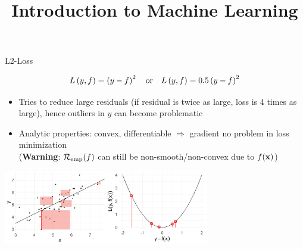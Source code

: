 \documentclass[11pt,compress,t,notes=noshow, xcolor=table]{beamer}
\title{Introduction to Machine Learning}
\begin{document}
    

\begin{vbframe}{L2-Loss}

\vspace*{-0.5cm}

$$
L\left(y, f\right) = \left(y-f\right)^2 \quad \text{or} \quad L\left(y, f\right) = 0.5 \left(y-f\right)^2
$$

\vspace*{-2mm}

\begin{itemize}
\item Tries to reduce large residuals (if residual is twice as large, loss is 4 times as large), hence outliers in $y$ can become problematic
\item Analytic properties: convex, differentiable $\Rightarrow$ gradient no problem in loss minimization\\ {\small (\textbf{Warning}: $\mathcal{R}_{\text{emp}}(f)$ can still be non-smooth/non-convex due to $f(\mathbf{x})$)}
\end{itemize}






\begin{center}
  \includegraphics[width = 9cm]{figure/loss_quadratic_2.png} \\
\end{center}

\end{vbframe}
\end{document}
